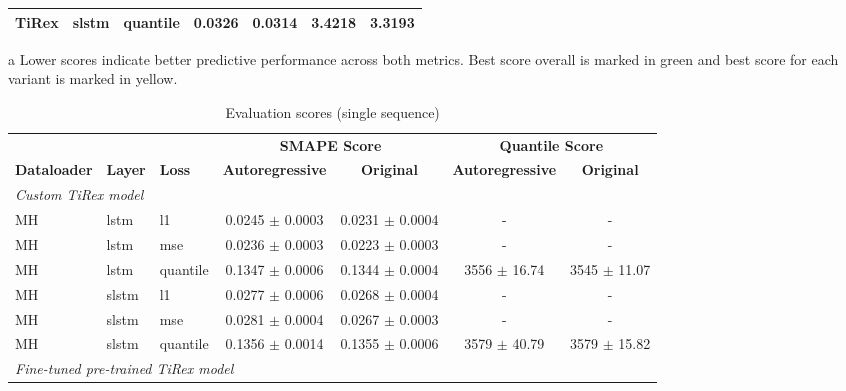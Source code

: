 \documentclass[a4paper,oneside,10pt,ngerman,english]{scrartcl}
\begin{document}
\begin{table}[htbp]
\begin{threeparttable}
\begin{tabular}{lllcccc}
			TiRex & slstm & quantile  & 0.0326 & \cellcolor[HTML]{006837}\color[HTML]{f1f1f1}0.0314 & 3.4218  & \cellcolor[HTML]{006837}\color[HTML]{f1f1f1} 3.3193  \\
			\bottomrule
		\end{tabular}
		\begin{tablenotes}
			\small
			\item[a] Lower scores indicate better predictive performance across both metrics. Best score overall is marked in green and best score for each variant is marked in yellow.
		\end{tablenotes}	
	\end{threeparttable}
\end{table}

\begin{table}[htbp]
	\centering
	\begin{threeparttable}
		\caption{Evaluation scores (single sequence)}
		\label{tab:scores_custom_tirex_single}
		\setlength{\tabcolsep}{3pt}
		\begin{tabular}{lllcccc}
			\toprule
			& & & \multicolumn{2}{c}{\textbf{SMAPE Score}} & \multicolumn{2}{c}{\textbf{Quantile Score}} \\
			\cmidrule(lr){4-5} \cmidrule(lr){6-7}
			\textbf{Dataloader} & \textbf{Layer} & \textbf{Loss} & \textbf{Autoregressive} & \textbf{Original} & \textbf{Autoregressive} & \textbf{Original} \\
			\midrule
			\multicolumn{7}{l}{{\small \emph{Custom TiRex model}}}\\
			MH & lstm & l1       & 0.0245 $\pm$ 0.0003 & \cellcolor[HTML]{fdfebc}0.0231 $\pm$ 0.0004 & - & - \\
			MH & lstm & mse      & 0.0236 $\pm$ 0.0003 & \cellcolor[HTML]{fdfebc}0.0223 $\pm$ 0.0003 & -  & -  \\
			MH & lstm & quantile & 0.1347 $\pm$ 0.0006 & \cellcolor[HTML]{fdfebc}0.1344 $\pm$ 0.0004 & 3556 $\pm$ 16.74 & 3545 $\pm$ 11.07 \\
			\addlinespace
			MH & slstm & l1      & 0.0277 $\pm$ 0.0006 & \cellcolor[HTML]{fdfebc}0.0268 $\pm$ 0.0004 & - & - \\
			MH & slstm & mse     & 0.0281 $\pm$ 0.0004 & \cellcolor[HTML]{fdfebc}0.0267 $\pm$ 0.0003 & - & - \\
			MH & slstm & quantile & 0.1356 $\pm$ 0.0014 & \cellcolor[HTML]{fdfebc}0.1355 $\pm$ 0.0006 & 3579 $\pm$ 40.79 & 3579 $\pm$ 15.82 \\
			\midrule
			\multicolumn{7}{l}{{\small \emph{Fine-tuned pre-trained TiRex model}}}\\

\end{tabular}
\end{threeparttable}
\end{table}
\end{document}
